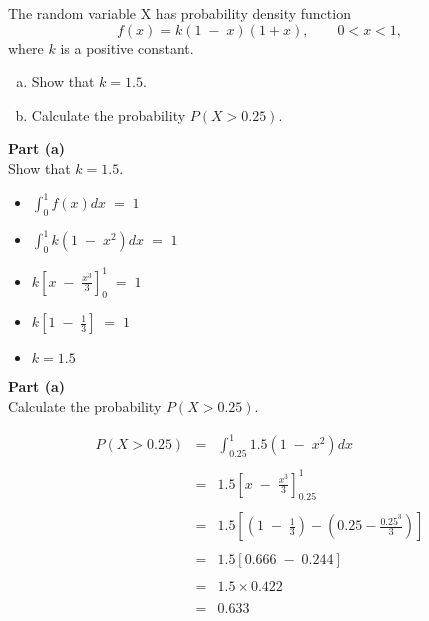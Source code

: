 \documentclass[a4paper,12pt]{article}
\begin{document}
\large
\noindent  The random variable X has probability density function
\[f ( x ) = k (1 \;-\; x )(1 + x ),
\qquad 0 < x < 1 ,\]
where $k$ is a positive constant.

\begin{enumerate}[(a)]
\item Show that $k = 1.5$.
\item Calculate the probability $P(X > 0.25)$.
\end{enumerate}

\newpage

\begin{framed}
\noindent \textbf{Part (a)} \\
Show that $k = 1.5$.
\end{framed}

\begin{itemize}

\item ${ \displaystyle  \int^{1}_{0} f(x) dx \;=\; 1 }$

\item ${ \displaystyle  \int^{1}_{0} k (1 \;-\; x^2 ) dx \;=\; 1 }$ 


\item ${ \displaystyle k \left[ x \;-\; \frac{x^3}{3} \right]^{1}_{0}  \;=\; 1 }$ 

\item ${ \displaystyle k \left[ 1 \;-\; \frac{1}{3} \right]  \;=\; 1 }$ 


\item $k = 1.5$

\end{itemize}
\newpage

\begin{framed}
\noindent \textbf{Part (a)} \\
Calculate the probability $P(X > 0.25)$.
\end{framed}

\begin{eqnarray*}
P ( X > 0.25) &=& \int^{1}_{0.25} 1.5 (1 \;-\; x^2 ) dx \\
& & \\
&=& 1.5 \left[ x \;-\; \frac{x^3}{3} \right]^{1}_{0.25}  \\
& & \\
&=& 1.5 \left[  \left( 1 \;-\; \frac{1}{3} \right) -\left( 0.25 - \frac{0.25^3}{3} \right) \right]  \\
& & \\
&=& 1.5 \left[  0.666 \;-\; 0.244 \right]  \\
& & \\
&=& 1.5 \times 0.422 \\
& & \\
&=& 0.633 \\
\end{eqnarray*}
\end{document}
